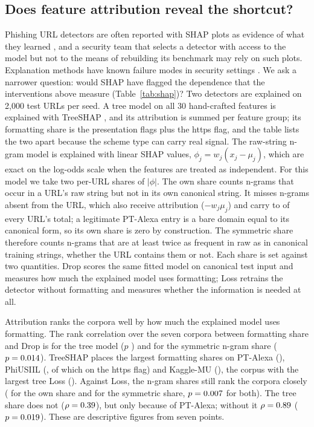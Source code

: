\subsection{Does feature attribution reveal the shortcut?}
\label{sec:shap}
Phishing URL detectors are often reported with SHAP plots as evidence of what they learned \citep{mia2024}, and a security team that selects a detector with access to the model but not to the means of rebuilding its benchmark may rely on such plots. Explanation methods have known failure modes in security settings \citep{warnecke2020,nadeem2023}. We ask a narrower question: would SHAP \citep{lundberg2017} have flagged the dependence that the interventions above measure (Table~\ref{tab:shap})? Two detectors are explained on 2,000 test URLs per seed. A tree model on all 30 hand-crafted features is explained with TreeSHAP \citep{lundberg2020}, and its attribution is summed per feature group; its formatting share is the presentation flags plus the https flag, and the table lists the two apart because the scheme type can carry real signal. The raw-string n-gram model is explained with linear SHAP values, $\phi_j = w_j (x_j - \mu_j)$, which are exact on the log-odds scale when the features are treated as independent. For this model we take two per-URL shares of $|\phi|$. The own share counts n-grams that occur in a URL's raw string but not in its own canonical string. It misses n-grams absent from the URL, which also receive attribution ($-w_j \mu_j$) and carry \ShAbsentMin{} to \ShAbsentMax{} of every URL's total; a legitimate PT-Alexa entry is a bare domain equal to its canonical form, so its own share is zero by construction. The symmetric share therefore counts n-grams that are at least twice as frequent in raw as in canonical training strings, whether the URL contains them or not. Each share is set against two quantities. Drop scores the same fitted model on canonical test input and measures how much the explained model uses formatting; Loss retrains the detector without formatting and measures whether the information is needed at all.

Attribution ranks the corpora well by how much the explained model uses formatting. The rank correlation over the seven corpora between formatting share and Drop is \ShRhoTreeSame{} for the tree model ($p$ \ShRhoTreeSameP) and \ShRhoCharSymSame{} for the symmetric n-gram share ($p = 0.014$). TreeSHAP places the largest formatting shares on PT-Alexa (\ShTreeFmtPTAlexa), PhiUSIIL (\ShTreeFmtPhiUSIIL, of which \ShHttpsPhiUSIIL{} on the https flag) and Kaggle-MU (\ShTreeFmtKaggleMU), the corpus with the largest tree Loss (\ShTreeDepKaggleMU). Against Loss, the n-gram shares still rank the corpora closely (\ShRhoChar{} for the own share and \ShRhoCharSym{} for the symmetric share, $p = 0.007$ for both). The tree share does not ($\rho = 0.39$), but only because of PT-Alexa; without it $\rho = 0.89$ ($p = 0.019$). These are descriptive figures from seven points.

